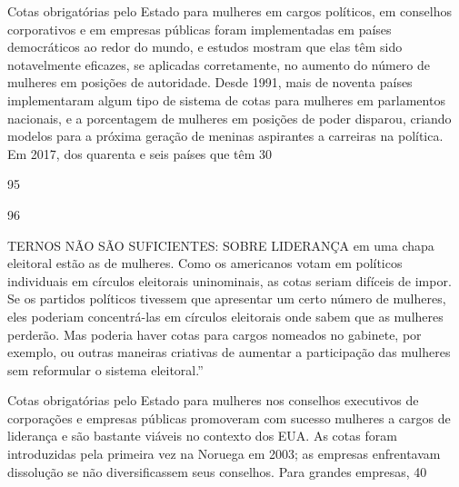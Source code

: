  \par 
Cotas obrigatórias pelo Estado para mulheres em cargos políticos, em conselhos corporativos e em empresas públicas foram implementadas em países democráticos ao redor do mundo, e estudos mostram que elas têm sido notavelmente eficazes, se aplicadas corretamente, no aumento do número de mulheres em posições de autoridade. Desde 1991, mais de noventa países implementaram algum tipo de sistema de cotas para mulheres em parlamentos nacionais, e a porcentagem de mulheres em posições de poder disparou, criando modelos para a próxima geração de meninas aspirantes a carreiras na política. Em 2017, dos quarenta e seis países que têm 30%
 \par 
95
 \par 
96
 \par 
TERNOS NÃO SÃO SUFICIENTES: SOBRE LIDERANÇA em uma chapa eleitoral estão as de mulheres. Como os americanos votam em políticos individuais em círculos eleitorais uninominais, as cotas seriam difíceis de impor. Se os partidos políticos tivessem que apresentar um certo número de mulheres, eles poderiam concentrá-las em círculos eleitorais onde sabem que as mulheres perderão. Mas poderia haver cotas para cargos nomeados no gabinete, por exemplo, ou outras maneiras criativas de aumentar a participação das mulheres sem reformular o sistema eleitoral.”
 \par 
Cotas obrigatórias pelo Estado para mulheres nos conselhos executivos de corporações e empresas públicas promoveram com sucesso mulheres a cargos de liderança e são bastante viáveis ​​no contexto dos EUA. As cotas foram introduzidas pela primeira vez na Noruega em 2003; as empresas enfrentavam dissolução se não diversificassem seus conselhos. Para grandes empresas, 40%
